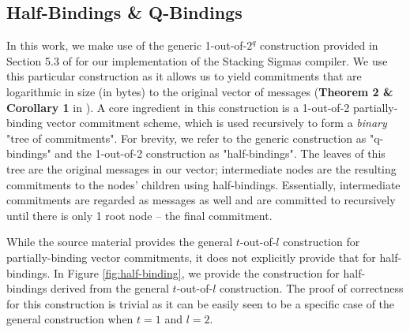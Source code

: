 \subsection{Half-Bindings \& Q-Bindings}\label{sec:qbinding}
In this work, we make use of the generic 1-out-of-$2^q$ construction provided in Section 5.3 of \cite{StackingSigmas} 
for our implementation of the Stacking Sigmas compiler. We use this 
particular construction as it allows us to yield commitments that are logarithmic in size (in bytes) to the original 
vector of messages (\textbf{Theorem 2 \& Corollary 1} in \cite{StackingSigmas}).
A core ingredient in this construction is a 1-out-of-2 partially-binding vector commitment scheme, which is used recursively 
to form a \textit{binary} "tree of commitments". 
For brevity, we refer to the generic construction as "q-bindings" and the 1-out-of-2 construction as "half-bindings".
The leaves of this tree are the original messages in our vector; intermediate nodes are the resulting commitments to the 
nodes' children using half-bindings. 
Essentially, intermediate commitments are regarded as messages as well and are committed to recursively until there is only 1 root node -- the final commitment. 

While the source material provides the general $t$-out-of-$l$ construction for partially-binding vector commitments, 
it does not explicitly provide that for half-bindings. 
In Figure \ref{fig:half-binding}, we provide the construction for half-bindings derived from the general $t$-out-of-$l$ 
construction. 
The proof of correctness for this construction is trivial as it can be easily seen to be a specific case of the general 
construction when $t = 1$ and $l = 2$. 

